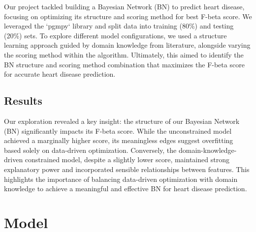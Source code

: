 \documentclass[letterpaper]{article}
\begin{document}
Our project tackled building a Bayesian Network (BN) to predict heart disease, focusing on optimizing its structure and scoring method for best F-beta score. We leveraged the `pgmpy` library and split data into training (80\%) and testing (20\%) sets. To explore different model configurations, we used a structure learning approach guided by domain knowledge from literature, alongside varying the scoring method within the algorithm. Ultimately, this aimed to identify the BN structure and scoring method combination that maximizes the F-beta score for accurate heart disease prediction.

\subsection{Results}


Our exploration revealed a key insight: the structure of our Bayesian Network (BN) significantly impacts its F-beta score. While the unconstrained model achieved a marginally higher score, its meaningless edges suggest overfitting based solely on data-driven optimization. Conversely, the domain-knowledge-driven constrained model, despite a slightly lower score, maintained strong explanatory power and incorporated sensible relationships between features. This highlights the importance of balancing data-driven optimization with domain knowledge to achieve a meaningful and effective BN for heart disease prediction.

\section{Model}

\end{document}
